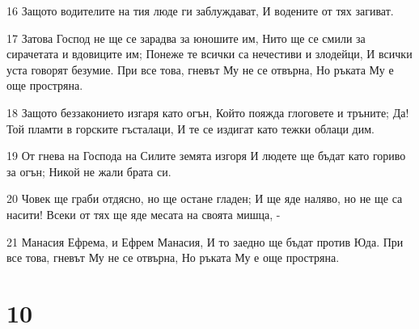 \par 16 Защото водителите на тия люде ги заблуждават, И водените от тях загиват.
\par 17 Затова Господ не ще се зарадва за юношите им, Нито ще се смили за сирачетата и вдовиците им; Понеже те всички са нечестиви и злодейци, И всички уста говорят безумие. При все това, гневът Му не се отвърна, Но ръката Му е още простряна.
\par 18 Защото беззаконието изгаря като огън, Който пояжда глоговете и тръните; Да! Той пламти в горските гъсталаци, И те се издигат като тежки облаци дим.
\par 19 От гнева на Господа на Силите земята изгоря И людете ще бъдат като гориво за огън; Никой не жали брата си.
\par 20 Човек ще граби отдясно, но ще остане гладен; И ще яде наляво, но не ще са насити! Всеки от тях ще яде месата на своята мишца, -
\par 21 Манасия Ефрема, и Ефрем Манасия, И то заедно ще бъдат против Юда. При все това, гневът Му не се отвърна, Но ръката Му е още простряна.

\chapter{10}

